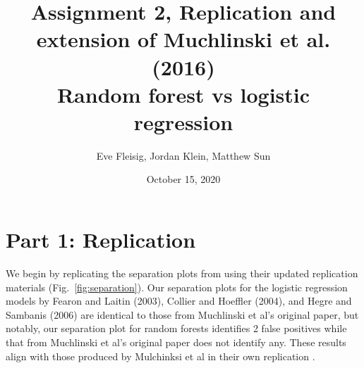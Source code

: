 \documentclass{article}
\title{Assignment 2, Replication and extension of Muchlinski et al. (2016)\\Random forest vs logistic regression}
\date{October 15, 2020}
\author{Eve Fleisig, Jordan Klein, Matthew Sun}
\begin{document}
\maketitle

\section*{Part 1: Replication}

We begin by replicating the separation plots from  \cite{muchlinski2016comparing}
using their updated replication materials (Fig.~\ref{fig:separation}). Our separation plots for the logistic regression models by Fearon and Laitin (2003), Collier and Hoeffler (2004), and Hegre and Sambanis (2006) are identical to those from Muchlinski et al's original paper, but notably, our separation plot for random forests identifies 2 false positives while that from Muchlinski et al's original paper does not identify any. These results align with those produced by Mulchinksi et al in their own replication \citep{muchlinski_2019}.
\end{document}
